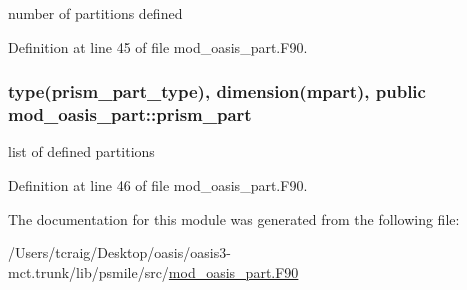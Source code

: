 number of partitions defined 



Definition at line 45 of file mod\+\_\+oasis\+\_\+part.\+F90.

\hypertarget{classmod__oasis__part_a326ce52f630ba7e71905af864a6cb2dc}{
\subsubsection[{prism\+\_\+part}]{\setlength{\rightskip}{0pt plus 5cm}type({\bf prism\+\_\+part\+\_\+type}), dimension({\bf mpart}), public mod\+\_\+oasis\+\_\+part\+::prism\+\_\+part}}\label{classmod__oasis__part_a326ce52f630ba7e71905af864a6cb2dc}


list of defined partitions 



Definition at line 46 of file mod\+\_\+oasis\+\_\+part.\+F90.



The documentation for this module was generated from the following file\+:\begin{DoxyCompactItemize}
\item 
/\+Users/tcraig/\+Desktop/oasis/oasis3-\/mct.\+trunk/lib/psmile/src/\hyperlink{mod__oasis__part_8_f90}{mod\+\_\+oasis\+\_\+part.\+F90}\end{DoxyCompactItemize}
